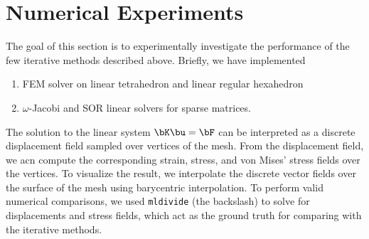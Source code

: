 \documentclass[11pt,titlepage]{article}
\begin{document}
\section{Numerical Experiments}

The goal of this section is to experimentally investigate the performance of the few iterative methods described above. Briefly, we have implemented 
\begin{enumerate}
    \item FEM solver on linear tetrahedron and linear regular hexahedron
    \item $\omega$-Jacobi and SOR linear solvers for sparse matrices. 
\end{enumerate}
The solution to the linear system $\bK \bu = \bF$ can be interpreted as a discrete displacement field sampled over vertices of the mesh. From the displacement field, we acn compute the corresponding strain, stress, and von Mises' stress fields over the vertices. To visualize the result, we interpolate the discrete vector fields over the surface of the mesh using barycentric interpolation. To perform valid numerical comparisons, we used \texttt{mldivide} (the backslash) to solve for displacements and stress fields, which act as the ground truth for comparing with the iterative methods. 




\newpage
\printbibliography
\end{document}
